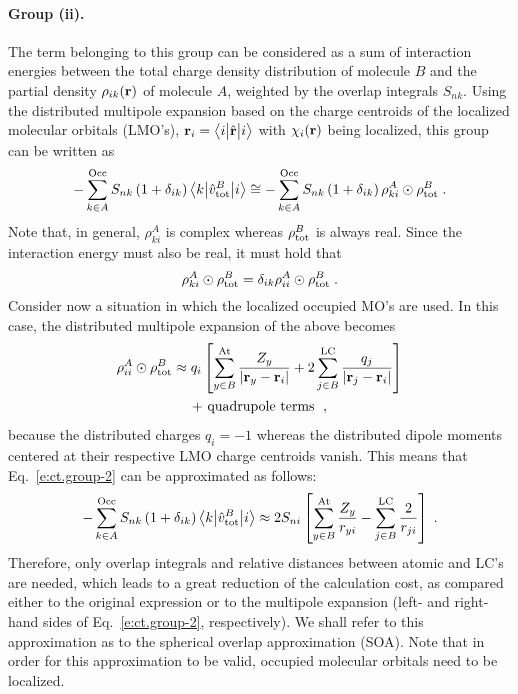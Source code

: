 \paragraph{Group (ii).}
The term belonging to this group can be considered as a sum of interaction
energies between the total charge density distribution of molecule $B$
and the partial density $\rho_{ik}({\bf r})$ of molecule $A$,
weighted by the overlap integrals $S_{nk}$. Using the distributed multipole 
expansion based on the charge centroids of the localized molecular orbitals (LMO's),
${\bf r}_i = \bigl\langle {i} \bigl\lvert {\hat{\bf r}} \bigl\lvert {i} \bigr\rangle$ with $\chi_i({\bf r})$ being localized,
this group can be written as
%
\begin{equation} \label{e:ct.group-2}
      - \sum_{k\in A}^{\rm Occ} S_{nk} \left(1+\delta_{ik}\right) \bigl\langle {k} \bigl\lvert {\hat{v}^B_{\rm tot} } \bigl\lvert {i} \bigr\rangle 
 \cong - \sum_{k\in A}^{\rm Occ} S_{nk} \left(1+\delta_{ik}\right) \rho_{ki}^A \odot \rho^B_{\rm tot} \;.
\end{equation}
%
Note that, in general, $\rho_{ki}^A$ is complex whereas $\rho^B_{\rm tot}$ is always real.
Since the interaction energy must also be real, it must hold that
%
\begin{equation} \label{e:ct.group-2-d}
 \rho_{ki}^A \odot \rho^B_{\rm tot} = \delta_{ik} \rho_{ii}^A \odot \rho^B_{\rm tot} \;.
\end{equation}
%
Consider now a situation in which the localized occupied MO's are used.
In this case, the distributed multipole expansion
of the above becomes
%
\begin{multline}
 \rho_{ii}^A \odot \rho^B_{\rm tot} 
 \approx 
 q_{i} 
 \left[
 \sum_{y\in B}^{\rm At}
  \frac{Z_y}{\vert {\bf r}_y - {\bf r}_i \vert } 
 +
 2\sum_{j\in B}^{\rm LC}
  \frac{q_j}{\vert {\bf r}_j - {\bf r}_i \vert } 
 \right] \\
 + \text{ quadrupole terms } \;,
\end{multline}
%
because the distributed charges
$q_i = -1$ whereas the distributed dipole moments %
centered at their
respective LMO charge centroids vanish.
This means that Eq.~\eqref{e:ct.group-2} can be approximated as follows:
%
\begin{equation} \label{e:ct.group-ii.final}
      - \sum_{k\in A}^{\rm Occ} S_{nk} \left(1+\delta_{ik}\right) \bigl\langle {k} \bigl\lvert {\hat{v}^B_{\rm tot} } \bigl\lvert {i} \bigr\rangle 
 \approx 2S_{ni}  \left[
 \sum_{y\in B}^{\rm At}
  \frac{Z_y}{ r_{yi} } 
 -
 \sum_{j\in B}^{\rm LC}
  \frac{2}{r_{ji}} 
 \right] \;.
\end{equation}
%
Therefore, only overlap integrals and relative distances between
atomic and LC's are needed, which leads to a great reduction of the
calculation cost,
as compared either to the original expression or to the multipole expansion (left\hyp{} and right\hyp{}hand sides
of Eq.~\eqref{e:ct.group-2}, respectively).
We shall refer to this approximation as to
the spherical overlap approximation (SOA). Note that in order for this approximation to be valid,
occupied molecular orbitals need to be localized.

